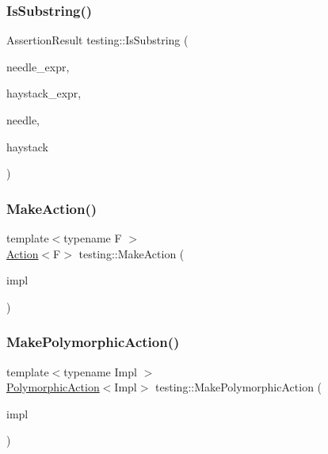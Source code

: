 \mbox{\label{namespacetesting_a571c7edcfc574269833ebe3e7d338ec5}} 
\subsubsection{\texorpdfstring{IsSubstring()}{IsSubstring()}\hspace{0.1cm}{\footnotesize\ttfamily [3/3]}}
{\footnotesize\ttfamily Assertion\+Result testing\+::\+Is\+Substring (\begin{DoxyParamCaption}\item[{const char $\ast$}]{needle\+\_\+expr,  }\item[{const char $\ast$}]{haystack\+\_\+expr,  }\item[{const \+::std\+::string \&}]{needle,  }\item[{const \+::std\+::string \&}]{haystack }\end{DoxyParamCaption})}

\mbox{\label{namespacetesting_ae6b9960db2b2685e043ce5215291f5b8}} 
\subsubsection{\texorpdfstring{MakeAction()}{MakeAction()}}
{\footnotesize\ttfamily template$<$typename F $>$ \\
\mbox{\hyperlink{classtesting_1_1Action}{Action}}$<$F$>$ testing\+::\+Make\+Action (\begin{DoxyParamCaption}\item[{\mbox{\hyperlink{classtesting_1_1ActionInterface}{Action\+Interface}}$<$ F $>$ $\ast$}]{impl }\end{DoxyParamCaption})}

\mbox{\label{namespacetesting_a36bd06c5ea972c6df0bd9f40a7a94c65}} 
\subsubsection{\texorpdfstring{MakePolymorphicAction()}{MakePolymorphicAction()}}
{\footnotesize\ttfamily template$<$typename Impl $>$ \\
\mbox{\hyperlink{classtesting_1_1PolymorphicAction}{Polymorphic\+Action}}$<$Impl$>$ testing\+::\+Make\+Polymorphic\+Action (\begin{DoxyParamCaption}\item[{const Impl \&}]{impl }\end{DoxyParamCaption})\hspace{0.3cm}{\ttfamily [inline]}}

